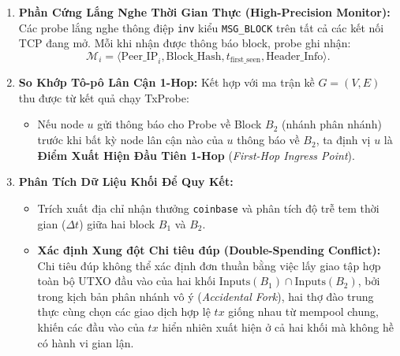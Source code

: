 \documentclass[11pt,a4paper]{article}
\begin{document}
\begin{enumerate}
    \item \textbf{Phần Cứng Lắng Nghe Thời Gian Thực (High-Precision Monitor):}
    Các probe lắng nghe thông điệp \texttt{inv} kiểu \texttt{MSG\_BLOCK} trên tất cả các kết nối TCP đang mở. Mỗi khi nhận được thông báo block, probe ghi nhận:
    \begin{equation}
        \mathcal{M}_i = \langle \text{Peer\_IP}_i, \text{Block\_Hash}, t_{\text{first\_seen}}, \text{Header\_Info} \rangle.
    \end{equation}
    
    \item \textbf{So Khớp Tô-pô Lân Cận 1-Hop:}
    Kết hợp với ma trận kề $G=(V, E)$ thu được từ kết quả chạy TxProbe:
    \begin{itemize}
        \item Nếu node $u$ gửi thông báo cho Probe về Block $B_2$ (nhánh phân nhánh) trước khi bất kỳ node lân cận nào của $u$ thông báo về $B_2$, ta định vị $u$ là \textbf{Điểm Xuất Hiện Đầu Tiên 1-Hop} (\textit{First-Hop Ingress Point}).
    \end{itemize}

    \item \textbf{Phân Tích Dữ Liệu Khối Để Quy Kết:}
    \begin{itemize}
        \item Trích xuất địa chỉ nhận thưởng \texttt{coinbase} và phân tích độ trễ tem thời gian ($\Delta t$) giữa hai block $B_1$ và $B_2$.
        \item \textbf{Xác định Xung đột Chi tiêu đúp (Double-Spending Conflict):} Chi tiêu đúp không thể xác định đơn thuần bằng việc lấy giao tập hợp toàn bộ UTXO đầu vào của hai khối $\text{Inputs}(B_1) \cap \text{Inputs}(B_2)$, bởi trong kịch bản phân nhánh vô ý (\textit{Accidental Fork}), hai thợ đào trung thực cùng chọn các giao dịch hợp lệ $tx$ giống nhau từ mempool chung, khiến các đầu vào của $tx$ hiển nhiên xuất hiện ở cả hai khối mà không hề có hành vi gian lận.


\end{itemize}
\end{enumerate}
\end{document}
